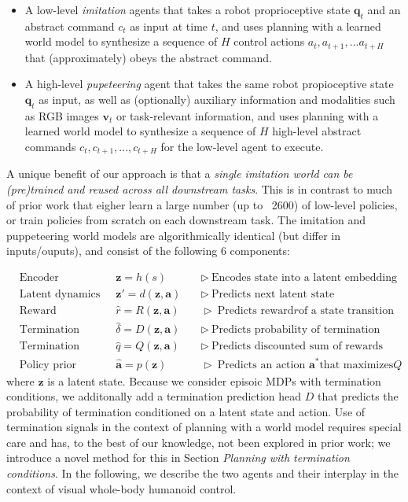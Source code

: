 \documentclass[sn-mathphys-num]{sn-jnl}%
\theoremstyle{thmstyleone}	%
\theoremstyle{thmstyletwo}	%
\theoremstyle{thmstylethree}	%
\begin{document}
\begin{itemize}
	\item[1.] 
	A low-level \textit{imitation} agents that takes a robot proprioceptive state $ \mathbf{q}_t $ and an abstract command $ c_t $ as input at time $ t $, and uses planning with a learned world model to synthesize a sequence of $ H $ control actions $ {a_t, a_{t+1}, ... a_{t+H}} $ that (approximately) obeys the abstract command.
	\item[2.] 
	A high-level \textit{pupeteering} agent that takes the same robot propioceptive state $ \mathbf{q}_t $ as input, as well as (optionally) auxiliary information and modalities such as RGB images $ \mathbf{v}_t $ or task-relevant information, and uses planning with a learned world model to synthesize a sequence of $ H $ high-level abstract commands $ {c_t, c_{t+1}, ..., c_{t+H}} $ for the low-level agent to execute.
\end{itemize}

A unique benefit of our approach is that a \textit{single imitation world can be (pre)trained and reused across all downstream tasks}.
This is in contrast to much of prior work that eigher learn a large number (up to ~2600) of low-level policies, or train policies from scratch on each downstream task.
The imitation and puppeteering world models are algorithmically identical (but differ in inputs/ouputs), and consist of the following 6 components:

\begin{equation}\label{key}
	\begin{aligned}
		& \text{Encoder} & \mathbf{z} = h(s) &  \quad \triangleright \ \text{Encodes state into a latent embedding} \\
		& \text{Latent dynamics} & \mathbf{z}' = d(\mathbf{z}, \mathbf{a}) & \quad \triangleright \ \text{Predicts next latent state} \\
		& \text{Reward} & \hat{r} = R(\mathbf{z}, \mathbf{a})  & \quad \triangleright \ \text{Predicts reward} r \text{of a state transition} \\
		& \text{Termination} & \hat{\delta} = D(\mathbf{z}, \mathbf{a}) & \quad \triangleright \ \text{Predicts probability of termination} \\
		& \text{Termination value} & \hat{q} = Q(\mathbf{z}, \mathbf{a}) & \quad \triangleright \ \text{Predicts discounted sum of rewards} \\
		& \text{Policy prior} & \hat{\mathbf{a}} = p(\mathbf{z}) & \quad \triangleright \ \text{Predicts an action } \mathbf{a}^* \text{that maximizes} Q
	\end{aligned}
\end{equation}
where $ \mathbf{z} $ is a latent state.
Because we consider episoic MDPs with termination conditions, we additonally add a termination prediction head $ D $ that predicts the probability of termination conditioned on a latent state and action.
Use of termination signals in the context of planning with a world model requires special care and has, to the best of our knowledge, not been explored in prior work;
we introduce a novel method for this in Section \textit{Planning with termination conditions}.
In the following, we describe the two agents and their interplay in the context of visual whole-body humanoid control.
\end{document}

